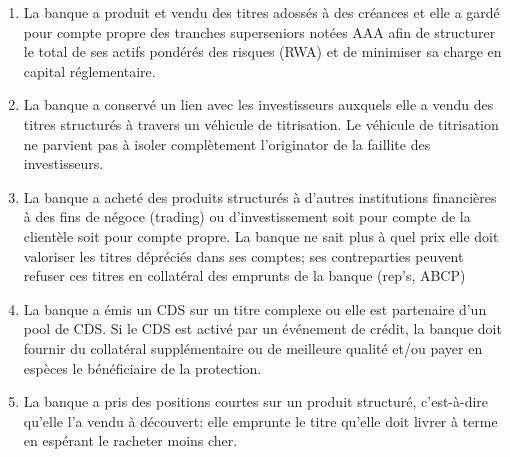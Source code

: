 	\begin{enumerate}
		\item La banque a produit et vendu des titres adossés à des créances et elle a gardé pour compte propre des tranches superseniors notées AAA afin de structurer le total de ses actifs pondérés des risques (RWA) et de minimiser sa charge en capital réglementaire.
		\item La banque a conservé un lien avec les investisseurs auxquels elle a vendu des titres structurés à travers un véhicule de titrisation. Le véhicule de titrisation ne parvient pas à isoler complètement l'originator de la faillite des investisseurs. 
		\item La banque a acheté des produits structurés à d’autres institutions 
financières à des fins de négoce (trading) ou d’investissement soit pour compte de la clientèle soit pour compte propre. La banque ne sait plus à quel prix elle doit valoriser les titres dépréciés dans ses comptes; ses contreparties peuvent refuser ces titres en collatéral des emprunts de la banque (rep's, ABCP) 
		\item La banque a émis un CDS sur un titre complexe ou elle est partenaire d'un pool de CDS. Si le CDS est activé par un événement de crédit, la banque doit fournir du collatéral supplémentaire ou de meilleure qualité et/ou payer en espèces le bénéficiaire de la protection. 
		\item La banque a pris des positions courtes sur un produit structuré, c'est-à-dire qu'elle l'a vendu à découvert: elle emprunte le titre qu'elle doit livrer à terme en espérant le racheter moins cher.
	\end{enumerate}
